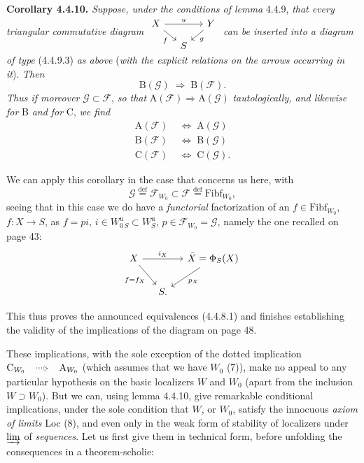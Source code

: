 \documentclass[11pt]{article}
\newcommand{\printedpage}[1]{\marginpar{\footnotesize p.~#1}}
\newcommand{\msp}[1]{\marginpar{\footnotesize [#1]}}
\newcommand{\Fibf}{\mathrm{Fibf}}
\newcommand{\dottedimpl}{\mathrel{\begin{tikzcd}[ampersand replacement=\&, column sep=small, baseline=-0.5ex]{}\arrow[r,Rightarrow,dotted]\&{}\end{tikzcd}}}
\begin{document}
\textbf{Corollary 4.4.10.} \textit{Suppose, under the conditions of lemma} 4.4.9, \textit{that every triangular commutative diagram} $\begin{tikzcd}[column sep=small, row sep=small, ampersand replacement=\&]
X \arrow[rr, "u"] \arrow[dr, "f"'] \& \& Y \arrow[dl, "g"] \\
\& S \&
\end{tikzcd}$ \textit{can be inserted into a diagram of type} (4.4.9.3) \textit{as above} (\textit{with the explicit relations on the arrows occurring in it}). \textit{Then}
\[
\mathrm{B}(\mathcal{G}) \;\Longrightarrow\; \mathrm{B}(\mathcal{F}).
\]
\textit{Thus if moreover} $\mathcal{G} \subset \mathcal{F}$, \textit{so that} $\mathrm{A}(\mathcal{F}) \Longrightarrow \mathrm{A}(\mathcal{G})$ \textit{tautologically, and likewise for} B \textit{and for} C, \textit{we find}
\[
\begin{aligned}
\mathrm{A}(\mathcal{F}) &\;\Longleftrightarrow\; \mathrm{A}(\mathcal{G})\\
\mathrm{B}(\mathcal{F}) &\;\Longleftrightarrow\; \mathrm{B}(\mathcal{G})\\
\mathrm{C}(\mathcal{F}) &\;\Longleftrightarrow\; \mathrm{C}(\mathcal{G}).
\end{aligned}
\]

We can apply this corollary in the case that concerns us here, with
\[
\mathcal{G} \overset{\text{def}}{=} \mathcal{F}_{W_0} \subset \mathcal{F} \overset{\text{def}}{=} \Fibf_{W_0},
\]
\printedpage{32}
\msp{page 55}
seeing that in this case we do have a \textit{functorial} factorization of an $f \in \Fibf_{W_0}$, $f : X \longrightarrow S$, as $f = pi$, $i \in W^{\mathrm{u}}_{0\,S} \subset W^{\mathrm{u}}_S$, $p \in \mathcal{F}_{W_0} = \mathcal{G}$, namely the one recalled on page 43:
\[
\begin{tikzcd}[column sep=small]
X \arrow[rr, "i_X"] \arrow[dr, "f=f_X"'] & & \bar{X} = \Phi_S(X) \arrow[dl, "p_X"] \\
& S. &
\end{tikzcd}
\]

This thus proves the announced equivalences (4.4.8.1) and finishes establishing the validity of the implications of the diagram on page 48.

These implications, with the sole exception of the dotted implication $\mathrm{C}_{W_0} \dottedimpl \mathrm{A}_{W_0}$ (which assumes that we have $W_0$ (7)), make no appeal to any particular hypothesis on the basic localizers $W$ and $W_0$ (apart from the inclusion $W \supset W_0$). But we can, using lemma 4.4.10, give remarkable conditional implications, under the sole condition that $W$, or $W_0$, satisfy the innocuous \textit{axiom}
\msp{page 56}
\textit{of limits} Loc (8), and even only in the weak form of stability of localizers under $\varinjlim$ of \textit{sequences}. Let us first give them in technical form, before unfolding the consequences in a theorem-scholie:
\end{document}
